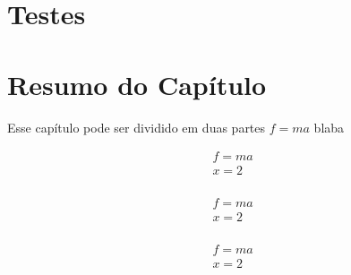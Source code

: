 \section{Testes}

\section{Resumo do Capítulo}
\label{metodo4}
Esse capítulo pode ser dividido em duas partes $	f=ma $ blaba \cite{bel/00}
 
\begin{gather}
	f=ma\\
	x=2\\
\end{gather}

\begin{align}
	f=ma\\
	x=2\\
\end{align}

\begin{eqnarray}
	f=ma\\
	x=2\nonumber\\
\end{eqnarray}


\clearpage